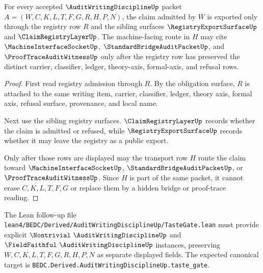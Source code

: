 \begin{theorem}
\label{thm:audit-writing-discipline-registry-handoff}
For every accepted $\AuditWritingDisciplineUp$ packet $A=(W,C,K,L,T,F,G,R,H,P,N)$, the claim admitted by $W$ is exported only through the registry row $R$ and the sibling surfaces $\RegistryExportSurfaceUp$ and $\ClaimRegistryLayerUp$. The machine-facing route in $H$ may cite $\MachineInterfaceSocketUp$, $\StandardBridgeAuditPacketUp$, and $\ProofTraceAuditWitnessUp$ only after the registry row has preserved the distinct carrier, classifier, ledger, theory-axis, formal-axis, and refusal rows.
\end{theorem}
\begin{proof}
First read registry admission through $R$. By the obligation surface, $R$ is attached to the same writing item, carrier, classifier, ledger, theory axis, formal axis, refusal surface, provenance, and local name.

Next use the sibling registry surfaces. $\ClaimRegistryLayerUp$ records whether the claim is admitted or refused, while $\RegistryExportSurfaceUp$ records whether it may leave the registry as a public export.

Only after those rows are displayed may the transport row $H$ route the claim toward $\MachineInterfaceSocketUp$, $\StandardBridgeAuditPacketUp$, or $\ProofTraceAuditWitnessUp$. Since $H$ is part of the same packet, it cannot erase $C,K,L,T,F,G$ or replace them by a hidden bridge or proof-trace reading.
\end{proof}



The Lean follow-up file \texttt{lean4/BEDC/Derived/AuditWritingDisciplineUp/TasteGate.lean} must provide explicit $\Nontrivial\ \AuditWritingDisciplineUp$ and $\FieldFaithful\ \AuditWritingDisciplineUp$ instances, preserving $W,C,K,L,T,F,G,R,H,P,N$ as separate displayed fields. The expected canonical target is \texttt{BEDC.Derived.AuditWritingDisciplineUp.taste\_gate}.

